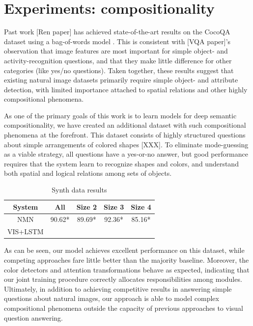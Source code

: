 \documentclass[10pt,twocolumn,letterpaper]{article}
\begin{document}
\section{Experiments: compositionality}

Past work [Ren paper] has achieved state-of-the-art results on the CocoQA dataset using a bag-of-words model . This is consistent with [VQA paper]'s observation that image features are most important for simple object- and activity-recognition questions, and that they make little difference for other categories (like yes/no questions). Taken together, these results suggest that existing natural image datasets primarily require simple object- and attribute detection, with limited importance attached to spatial relations and other highly compositional phenomena.

As one of the primary goals of this work is to learn models for deep semantic compositionality, we have created an additional dataset with such compositional phenomena at the forefront. This dataset consists of highly structured questions about simple arrangements of colored shapes [XXX]. To eliminate mode-guessing as a viable strategy, all questions have a yes-or-no answer, but good performance requires that the system learn to recognize shapes and colors, and understand both spatial and logical relations among sets of objects.


\begin{table}[h]
  \footnotesize
  \center
  \begin{tabular}{ccccc}
    \toprule
    System & All & Size 2 & Size 3 & Size 4 \\
    \midrule
    NMN & 90.62* & 89.69* & 92.36* & 85.16* \\
    VIS+LSTM &  \\
    \bottomrule
  \end{tabular}
  \caption{Synth data results}
\end{table}

As can be seen, our model achieves excellent performance on this dataset, while competing approaches fare little better than the majority baseline. Moreover, the color detectors and attention transformations behave as expected, indicating that our joint training procedure correctly allocates responsibilities among modules. Ultimately, in addition to achieving competitive results in answering simple questions about natural images, our approach is able to model complex compositional phenomena outside the capacity of previous approaches to visual question answering.
\end{document}
